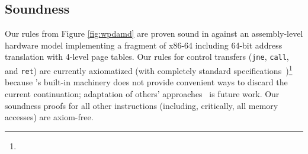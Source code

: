 \subsection{Soundness}
\label{sec:soundness}
Our rules from Figure \ref{fig:wpdamd} are proven sound in \iris against an assembly-level hardware model
implementing a fragment of x86-64 including 64-bit address translation with 4-level page tables.
Our rules for control transfers (\lstinline|jne|, \lstinline|call|, and \lstinline|ret|) are currently
axiomatized (with completely standard specifications~\cite{ni2007contexts,Chlipala2013Bedrock})\footnote{
} 
because \iris's built-in machinery does not provide
convenient ways to discard the current continuation; adaptation of others'
approaches~\cite{de2023type} is future work.
Our soundness proofs for all other instructions (including, critically, all memory accesses)
are axiom-free.
